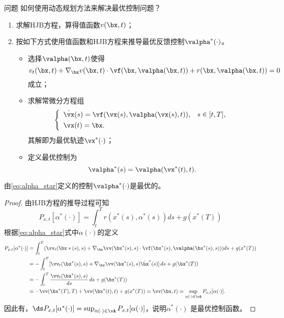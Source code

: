 \begin{frame}{\secname}  
\begin{block}{问题}
如何使用动态规划方法来解决最优控制问题？
\end{block} \pause 
\begin{enumerate}
    \item 求解HJB方程，算得值函数$v(\bx, t)$；\\[.1in]
    \item 按如下方式使用值函数和HJB方程来推导最优反馈控制$\valpha^*(\cdot)$。\\[.1in]
    \begin{itemize}
        \item 选择$\valpha(\bx, t)$使得
        $$
        v_t(\bx, t) + \nabla_\bx v(\bx, t)\cdot \vf(\bx,\valpha(\bx, t)) + r(\bx, \valpha(\bx, t))=0
        $$
        成立；\\[.1in]
        \item 求解常微分方程组
        $$
        \left\{
        \begin{array}{ll}
            \dot\vx(s) = \vf(\vx(s), \valpha(\vx(s), t)),  &  s \in [t, T], \\[.05in]
            \vx(t) = \bx. & 
        \end{array}
        \right.
        $$
        其解即为最优轨迹$\vx^*(\cdot)$；\\[.1in]
        \item 定义最优控制为
        \begin{equation}\label{eq:alpha_star}
            \valpha^*(s) = \valpha(\vx^*(t),t).
        \end{equation}
    \end{itemize}
\end{enumerate}
\end{frame}

\begin{frame}{\secname}  
\small 
\begin{theorem}[最优控制验证]
由\eqref{eq:alpha_star}定义的控制$\valpha^*(\cdot)$是最优的。
\end{theorem}  
\begin{proof}
由HJB方程的推导过程可知
$$
P_{x,t}[\alpha^*(\cdot)]=\int^T_t r(x^*(s),\alpha^*(s))ds+g(x^*(T))
$$
根据\eqref{eq:alpha_star}式中$\alpha(\cdot)$的定义
$$
\begin{aligned}
P_{x,t}[\alpha^*(\cdot)] &=\int^T_t( \vv_t(\bx*(s), s) + \nabla_\bx \vv(\bx^*(s), s)\cdot \vf(\bx^*(s),\valpha(\bx^*(s), s)) )ds+g(x^*(T))\\
&=-\int^T_t [\vv_t(\bx^*(s),s)+ \nabla_\bx \vv(\bx^*(s), s)\dot{\bx}^*(s)]\,ds+g(\bx^*(T))\\
&=-\int^T_t \frac{\vv_t(\bx^*(s),s)}{ds}\,ds+g(\bx^*(T))\\
&= -\vv(\bx^*(T),T)+\vv(\bx^*(t),t)+g(x^*(T)) =\vv(\bx,t) =\sup_{\alpha(\cdot)\in\vA}P_{x,t}[\alpha(\cdot)].
\end{aligned}
$$
因此有，$\ds P_{x,t}[\alpha^*(\cdot)]=\sup_{\alpha(\cdot)\in \vA}P_{x,t}[\alpha(\cdot)]$，说明$\alpha^*(\cdot)$
是最优控制函数。 
\end{proof}

\end{frame}

